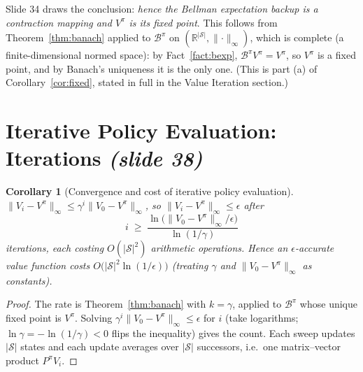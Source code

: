 \documentclass[11pt,a4paper]{article}
\newcommand{\R}{\mathbb{R}}
\newcommand{\cS}{\mathcal{S}}
\newcommand{\Bpi}{\mathcal{B}^{\pi}}
\newcommand{\norm}[1]{\lVert #1\rVert_\infty}
\newcommand{\slide}[1]{\texorpdfstring{\emph{(slide #1)}}{(slide #1)}}
\newcommand{\pdfnum}[1]{\setcounter{theorem}{\numexpr #1-1\relax}}
\theoremstyle{plain}
\newtheorem{corollary}[theorem]{Corollary}
\theoremstyle{definition}
\theoremstyle{remark}
\begin{document}
Slide 34 draws the conclusion: \emph{hence the Bellman expectation backup is a contraction mapping and $V^\pi$ is its fixed point}. This follows from Theorem~\ref{thm:banach} applied to $\Bpi$ on $(\R^{|\cS|},\norm{\cdot})$, which is complete (a finite-dimensional normed space): by Fact~\ref{fact:bexp}, $\Bpi V^\pi=V^\pi$, so $V^\pi$ is a fixed point, and by Banach's uniqueness it is the only one. (This is part (a) of Corollary~\ref{cor:fixed}, stated in full in the Value Iteration section.)

\section{Iterative Policy Evaluation: Iterations \slide{38}}\label{sec:peiters}
\pdfnum{6}
\begin{corollary}[Convergence and cost of iterative policy evaluation]\label{cor:pe}
$\norm{V_i-V^\pi}\le\gamma^i\norm{V_0-V^\pi}$, so $\norm{V_i-V^\pi}\le\epsilon$ after
\[
i\;\ge\;\frac{\ln\!\big(\norm{V_0-V^\pi}/\epsilon\big)}{\ln(1/\gamma)}
\]
iterations, each costing $O(|\cS|^2)$ arithmetic operations. Hence an $\epsilon$-accurate value function costs $O\big(|\cS|^2\ln(1/\epsilon)\big)$ (treating $\gamma$ and $\norm{V_0-V^\pi}$ as constants).
\end{corollary}
\begin{proof}
The rate is Theorem~\ref{thm:banach} with $k=\gamma$, applied to $\Bpi$ whose unique fixed point is $V^\pi$. Solving $\gamma^i\norm{V_0-V^\pi}\le\epsilon$ for $i$ (take logarithms; $\ln\gamma=-\ln(1/\gamma)<0$ flips the inequality) gives the count. Each sweep updates $|\cS|$ states and each update averages over $|\cS|$ successors, i.e.\ one matrix--vector product $P^\pi V_i$.
\end{proof}
\end{document}
